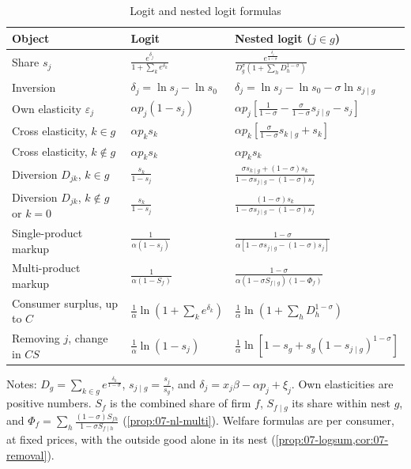 \begin{table}[htbp]
\centering
\caption{Logit and nested logit formulas}\label{tab:07-nl-formulas}
\small
\renewcommand{\arraystretch}{1.8}
\begin{tabular}{@{}lll@{}}
\toprule
Object & Logit & Nested logit ($j \in g$) \\
\midrule
Share $s_j$ & $\displaystyle \frac{e^{\delta_j}}{1 + \sum_k e^{\delta_k}}$ & $\displaystyle \frac{e^{\frac{\delta_j}{1-\sigma}}}{D_g^{\sigma}\left(1 + \sum_h D_h^{1-\sigma}\right)}$ \\
Inversion & $\displaystyle \delta_j = \ln s_j - \ln s_0$ & $\displaystyle \delta_j = \ln s_j - \ln s_0 - \sigma\ln s_{j \mid g}$ \\
Own elasticity $\varepsilon_j$ & $\displaystyle \alpha p_j(1 - s_j)$ & $\displaystyle \alpha p_j\left[\frac{1}{1-\sigma} - \frac{\sigma}{1-\sigma}s_{j \mid g} - s_j\right]$ \\
Cross elasticity, $k \in g$ & $\displaystyle \alpha p_k s_k$ & $\displaystyle \alpha p_k\left[\frac{\sigma}{1-\sigma}s_{k \mid g} + s_k\right]$ \\
Cross elasticity, $k \notin g$ & $\displaystyle \alpha p_k s_k$ & $\displaystyle \alpha p_k s_k$ \\
Diversion $D_{jk}$, $k \in g$ & $\displaystyle \frac{s_k}{1 - s_j}$ & $\displaystyle \frac{\sigma s_{k \mid g} + (1-\sigma)s_k}{1 - \sigma s_{j \mid g} - (1-\sigma)s_j}$ \\
Diversion $D_{jk}$, $k \notin g$ or $k = 0$ & $\displaystyle \frac{s_k}{1 - s_j}$ & $\displaystyle \frac{(1-\sigma)s_k}{1 - \sigma s_{j \mid g} - (1-\sigma)s_j}$ \\
Single-product markup & $\displaystyle \frac{1}{\alpha(1 - s_j)}$ & $\displaystyle \frac{1-\sigma}{\alpha\left[1 - \sigma s_{j \mid g} - (1-\sigma)s_j\right]}$ \\
Multi-product markup & $\displaystyle \frac{1}{\alpha(1 - S_f)}$ & $\displaystyle \frac{1-\sigma}{\alpha(1 - \sigma S_{f \mid g})(1 - \Phi_f)}$ \\
Consumer surplus, up to $C$ & $\displaystyle \frac{1}{\alpha}\ln\left(1 + \sum_k e^{\delta_k}\right)$ & $\displaystyle \frac{1}{\alpha}\ln\left(1 + \sum_h D_h^{1-\sigma}\right)$ \\
Removing $j$, change in $CS$ & $\displaystyle \frac{1}{\alpha}\ln(1 - s_j)$ & $\displaystyle \frac{1}{\alpha}\ln\left[1 - s_g + s_g(1 - s_{j \mid g})^{1-\sigma}\right]$ \\
\bottomrule
\end{tabular}
\par\smallskip
\begin{minipage}{0.95\textwidth}
\footnotesize Notes: $D_g = \sum_{k \in g}e^{\frac{\delta_k}{1-\sigma}}$, $s_{j \mid g} = \frac{s_j}{s_g}$, and
$\delta_j = x_j\beta - \alpha p_j + \xi_j$. Own elasticities are positive numbers. $S_f$ is the combined share
of firm $f$, $S_{f \mid g}$ its share within nest $g$, and
$\Phi_f = \sum_h \frac{(1-\sigma)S_{fh}}{1 - \sigma S_{f \mid h}}$ (\cref{prop:07-nl-multi}). Welfare formulas are per
consumer, at fixed prices, with the outside good alone in its nest (\cref{prop:07-logsum,cor:07-removal}).
\end{minipage}
\end{table}

